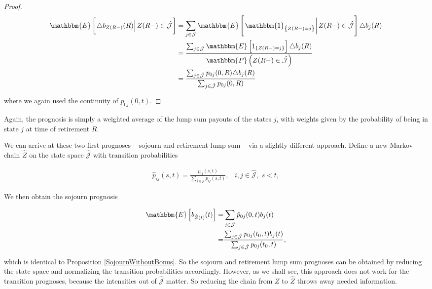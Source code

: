 \documentclass{book}
\newcommand{\1}[1]{\mathbbm{1}_{\left\lbrace #1 \right\rbrace}}
\newcommand{\expec}[1][def]{\mathbbm{E} \left[ #1 \right]}
\newcommand{\econd}[2][def]{\mathbbm{E} \left[ \left. #1 \right| #2 \right]}
\newcommand{\probability}[1][def]{\mathbbm{P} \left( #1 \right)}
\theoremstyle{break}
\theoremstyle{remark}
\newenvironment{remark}
  {\pushQED{\qed}\renewcommand{\qedsymbol}{\scalebox{1.4}{$\circ$}}\remarkx}
  {\popQED\endremarkx}
\numberwithin{equation}{section}
\begin{document}
\begin{proof}
\begin{align*}
	\econd[\triangle b_{Z(R-)}(R)]{Z(R-) \in \hat{\mathcal{J}}} &= \sum_{j \in \mathcal{J}} \econd[\1{Z(R-)=j}]{Z(R-) \in \hat{\mathcal{J}}} \triangle b_j(R) \\
	&= \frac{\sum_{j \in \hat{\mathcal{J}}} \expec[ 1_{\{Z(R-)=j\}} ] \triangle b_j(R)}{\probability[Z(R-) \in \hat{\mathcal{J}}]} \\
	&= \frac{\sum_{j \in \hat{\mathcal{J}}} p_{0j}(0,R) \triangle b_j(R)}{\sum_{j \in \hat{\mathcal{J}}} p_{0j}(0,R)}
\end{align*}

where we again used the continuity of $p_{0j}(0,t)$.
\end{proof}

Again, the prognosis is simply a weighted average of the lump sum payouts of the states $j$, with weights given by the probability of being in state $j$ at time of retirement $R$.

\begin{remark} \label{ReducedStateSpace}
We can arrive at these two first prognoses -- sojourn and retirement lump sum -- via a slightly different approach. Define a new Markov chain $\hat{Z}$ on the state space $\hat{\mathcal{J}}$ with transition probabilities

\begin{align*}
    \hat{p}_{ij}(s,t) = \frac{p_{ij}(s,t)}{\sum_{j \in \hat{\mathcal{J}}} p_{ij}(s,t)}, \, \, \, \, \, i,j \in \hat{\mathcal{J}}, \, \, s < t,
\end{align*}

We then obtain the sojourn prognosis

\begin{align*}
    \expec[b_{\hat{Z}(t)}(t)] =& \sum_{j \in \hat{\mathcal{J}}} \hat{p}_{0j}(0,t) b_j(t) \\
    =& \frac{\sum_{j \in \hat{\mathcal{J}}} p_{0j}(t_0,t) b_j(t)}{\sum_{j \in \hat{\mathcal{J}}} p_{0j}(t_0,t)},
\end{align*}

which is identical to Proposition \ref{SojournWithoutBonus}. So the sojourn and retirement lump sum prognoses can be obtained by reducing the state space and normalizing the transition probabilities accordingly. However, as we shall see, this approach does not work for the transition prognoses, because the intensities out of $\hat{\mathcal{J}}$ matter. So reducing the chain from $Z$ to $\hat{Z}$ throws away needed information.
\end{remark}
\end{document}
